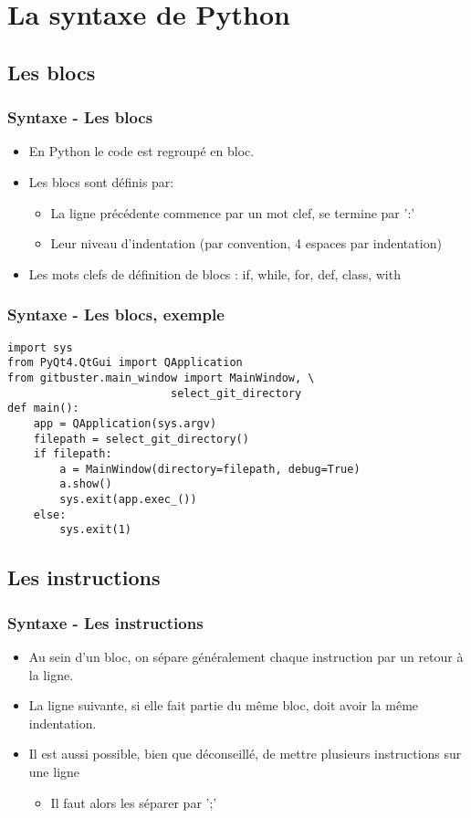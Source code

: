 \section{La syntaxe de Python}

\subsection{Les blocs}
\begin{frame}[fragile]
  \frametitle{Syntaxe - Les blocs}
  \begin{itemize}
    \item En Python le code est regroupé en bloc.
    \item Les blocs sont définis par:
    \begin{itemize}
      \item La ligne précédente commence par un mot clef, se termine par ':'
      \item Leur niveau d'indentation (par convention, 4 espaces par indentation)
    \end{itemize}
    \item Les mots clefs de définition de blocs : \alert<1->{if}, \alert<2->{while}, \alert<3->{for}, \alert<4->{def}, \alert<5->{class}, \alert<6->{with}
  \end{itemize}
\end{frame}

\begin{frame}[fragile]
  \frametitle{Syntaxe - Les blocs, exemple}
  \begin{lstlisting}
import sys
from PyQt4.QtGui import QApplication
from gitbuster.main_window import MainWindow, \
                         select_git_directory
def main():
    app = QApplication(sys.argv)
    filepath = select_git_directory()
    if filepath:
        a = MainWindow(directory=filepath, debug=True)
        a.show()
        sys.exit(app.exec_())
    else:
        sys.exit(1)
  \end{lstlisting}
\end{frame}

\subsection{Les instructions}
\begin{frame}
  \frametitle{Syntaxe - Les instructions}
  \begin{itemize}
    \item<1-> Au sein d'un bloc, on sépare généralement chaque instruction par un retour à la ligne.
    \item<2-> La ligne suivante, si elle fait partie du même bloc, doit avoir la même indentation.
    \item<3-> Il est aussi possible, bien que déconseillé, de mettre plusieurs instructions sur une ligne
    \begin{itemize}
      \item<4-> Il faut alors les séparer par ';'
    \end{itemize}
  \end{itemize}
\end{frame}

